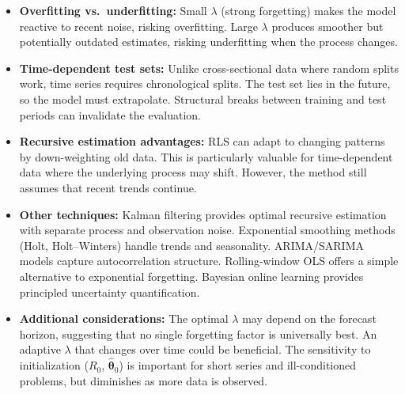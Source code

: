 \documentclass[11pt,a4paper]{article}
\begin{document}
\begin{itemize}
  \item \textbf{Overfitting vs.\ underfitting:} Small $\lambda$ (strong forgetting) makes the model reactive to recent noise, risking overfitting. Large $\lambda$ produces smoother but potentially outdated estimates, risking underfitting when the process changes.

  \item \textbf{Time-dependent test sets:} Unlike cross-sectional data where random splits work, time series requires chronological splits. The test set lies in the future, so the model must extrapolate. Structural breaks between training and test periods can invalidate the evaluation.

  \item \textbf{Recursive estimation advantages:} RLS can adapt to changing patterns by down-weighting old data. This is particularly valuable for time-dependent data where the underlying process may shift. However, the method still assumes that recent trends continue.

  \item \textbf{Other techniques:} Kalman filtering provides optimal recursive estimation with separate process and observation noise. Exponential smoothing methods (Holt, Holt--Winters) handle trends and seasonality. ARIMA/SARIMA models capture autocorrelation structure. Rolling-window OLS offers a simple alternative to exponential forgetting. Bayesian online learning provides principled uncertainty quantification.

  \item \textbf{Additional considerations:} The optimal $\lambda$ may depend on the forecast horizon, suggesting that no single forgetting factor is universally best. An adaptive $\lambda$ that changes over time could be beneficial. The sensitivity to initialization ($R_0$, $\hat{\boldsymbol\theta}_0$) is important for short series and ill-conditioned problems, but diminishes as more data is observed.
\end{itemize}
\end{document}
